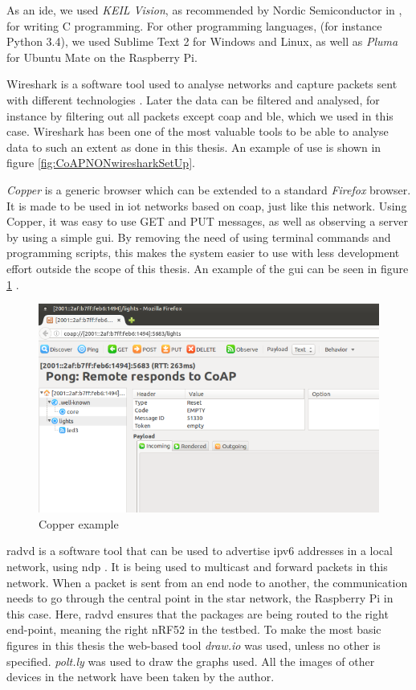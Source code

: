 \noindent As an \gls{ide}, we used \textit{KEIL Vision}, as recommended by Nordic Semiconductor in \cite{nord}, for writing C programming. For other programming languages, (for instance Python 3.4), we used Sublime Text 2 for Windows and Linux, as well as \textit{Pluma} for Ubuntu Mate on the Raspberry Pi. 

\noindent Wireshark is a software tool used to analyse networks and capture packets sent with different technologies \cite{lamping2004wireshark}. Later the data can be filtered and analysed, for instance by filtering out all packets except \gls{coap} and \gls{ble}, which we used in this case. Wireshark has been one of the most valuable tools to be able to analyse data to such an extent as done in this thesis. An example of use is shown in figure \ref{fig:CoAPNONwiresharkSetUp}. 

\noindent \textit{Copper}\cite{copper3} is a generic browser which can be extended to a standard \textit{Firefox} browser. It is made to be used in \gls{iot} networks based on \gls{coap}, just like this network. Using Copper, it was easy to use GET and PUT messages, as well as observing a server by using a simple \gls{gui}. By removing the need of using terminal commands and programming scripts, this makes the system easier to use with less development effort outside the scope of this thesis. An example of the \gls{gui} can be seen in figure \ref{fig:copperExample} 
\cite{kovatsch2011demo}.

\begin{figure}[ht]
    \centering
    \includegraphics[width=1.0\textwidth]{CopperExample.png}    
    \caption{Copper example}
    \label{fig:copperExample}
\end{figure}

\noindent \gls{radvd} is a software tool that can be used to advertise \gls{ipv6} addresses in a local network, using \gls{ndp} \cite{chown2011rogue}. It is being used to multicast and forward packets in this network. When a packet is sent from an end node to another, the communication needs to go through the central point in the star network, the Raspberry Pi in this case. Here, \gls{radvd} ensures that the packages are being routed to the right end-point, meaning the right nRF52 in the testbed. To make the most basic figures in this thesis the web-based tool \textit{draw.io} was used, unless no other is specified. \textit{polt.ly} was used to draw the graphs used. All the images of other devices in the network have been taken by the author. 


